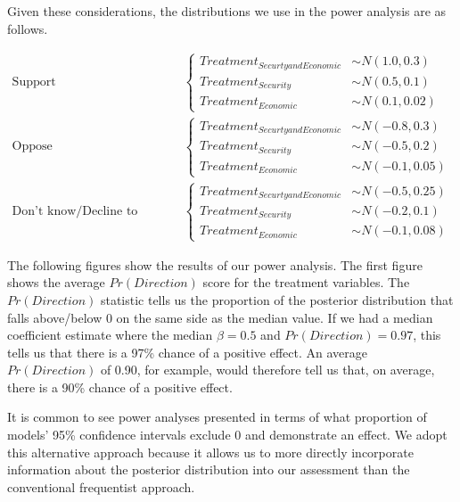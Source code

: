 \documentclass[
  10,
  letterpaper,
  DIV=11,
  numbers=noendperiod]{scrartcl}
\begin{document}
Given these considerations, the distributions we use in the power
analysis are as follows.

\begin{align}
\text{Support} &
\begin{cases}
Treatment_{SecurtyandEconomic} &\sim N(1.0, 0.3) \\
Treatment_{Security} &\sim N(0.5, 0.1) \\
Treatment_{Economic} &\sim N(0.1, 0.02) 
\end{cases} 
\\
\text{Oppose} &
\begin{cases}
Treatment_{SecurtyandEconomic} &\sim N(-0.8, 0.3) \\
Treatment_{Security} &\sim N(-0.5, 0.2) \\
Treatment_{Economic} &\sim N(-0.1, 0.05) 
\end{cases} 
\\
\text{Don't know/Decline to answer} &
\begin{cases}
Treatment_{SecurtyandEconomic} &\sim N(-0.5, 0.25) \\
Treatment_{Security} &\sim N(-0.2, 0.1) \\
Treatment_{Economic} &\sim N(-0.1, 0.08) 
\end{cases}
\end{align}

The following figures show the results of our power analysis. The first
figure shows the average \(Pr(Direction)\) score for the treatment
variables. The \(Pr(Direction)\) statistic tells us the proportion of
the posterior distribution that falls above/below 0 on the same side as
the median value. If we had a median coefficient estimate where the
median \(\beta = 0.5\) and \(Pr(Direction) = 0.97\), this tells us that
there is a 97\% chance of a positive effect. An average
\(Pr(Direction)\) of 0.90, for example, would therefore tell us that, on
average, there is a 90\% chance of a positive effect.

It is common to see power analyses presented in terms of what proportion
of models' 95\% confidence intervals exclude 0 and demonstrate an
effect. We adopt this alternative approach because it allows us to more
directly incorporate information about the posterior distribution into
our assessment than the conventional frequentist approach.
\end{document}
